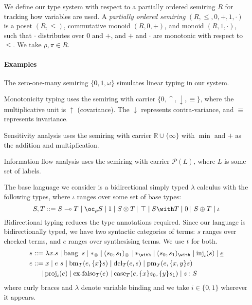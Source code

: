 We define our type system with respect to a partially ordered semiring
$R$ for tracking how variables are used. A \emph{partially ordered
  semiring} $(R, \leq, 0, +, 1 , \cdot)$ is a poset $(R, \leq)$,
commutative monoid $(R, 0, +)$, and monoid $(R, 1, \cdot)$, such that
$\cdot$ distributes over $0$ and $+$, and $+$ and $\cdot$ are
monotonic with respect to $\leq$. We take $\rho,\pi \in R$.

\paragraph{Examples}
\begin{inparaenum}
\item The zero-one-many semiring $\{0,1,\omega\}$ simulates linear
  typing in our system.
\item Monotonicity typing uses the semiring with carrier
  $\{0,\uparrow,\downarrow,\equiv\}$, where the multiplicative unit is
  $\uparrow$ (covariance). The $\downarrow$ represents
  contra-variance, and $\equiv$ represents invariance.
\item Sensitivity analysis uses the semiring with carrier
  $\mathbb{R} \cup \{\infty\}$ with $\min$ and $+$ as the addition and
  multiplication.
\item Information flow analysis uses the semiring with carrier
  $\mathcal{P}(L)$, where $L$ is some set of labels.
\end{inparaenum}

\medskip

The base language we consider is a
bidirectional \citep{DBLP:journals/toplas/PierceT00} simply typed
$\lambda$ calculus with the following types, where $\iota$ ranges over
some set of base types:
\begin{displaymath}
  S,T ::= \fun{S}{T} \mid \excl{\rho}{S} \mid \tensorOne \mid \tensor{S}{T} \mid
  \withTOne \mid \withT{S}{T} \mid \sumTZero \mid \sumT{S}{T} \mid \iota
\end{displaymath}
Bidirectional typing reduces the type annotations required.  Since our
language is bidirectionally typed, we have two syntactic categories of
terms: $s$ ranges over checked terms, and $e$ ranges over synthesising
terms. We use $t$ for both.
\begin{displaymath}
  \begin{aligned}
    s &  ::= \lam{x}{s} \mid \bang{s} \mid \unit \mid \ten{s_0}{s_1} \mid \eat \mid \wth{s_0}{s_1} \mid \inj{i}{s} \mid \emb{e} \\
    e &  ::= x \mid \app{e}{s} \mid \bm{T}{e}{\bind{x}{s}} \mid \del{T}{e}{s} \mid \prm{T}{e}{\bind{x,y}{s}} \\
      & \quad \mid \proj{i}{e} \mid \exf{T}{e} \mid
             \cse{T}{e}{\bind{x}{s_0}}{\bind{y}{s_1}} \mid \ann{s}{S}
  \end{aligned}
\end{displaymath}
where curly braces and $\lambda$ denote variable binding and we take
$i \in \{0,1\}$ wherever it appears.


